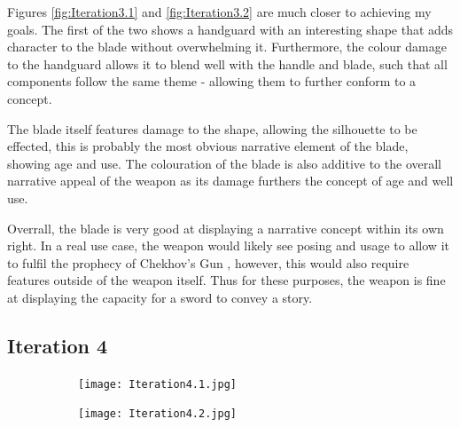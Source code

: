 \documentclass{article}
\begin{document}
Figures \ref{fig:Iteration3.1} and \ref{fig:Iteration3.2} are much closer to achieving my goals. The first of the two shows a handguard with an interesting shape that adds character to the blade without overwhelming it. Furthermore, the colour damage to the handguard allows it to blend well with the handle and blade, such that all components follow the same theme - allowing them to further conform to a concept.

The blade itself features damage to the shape, allowing the silhouette to be effected, this is probably the most obvious narrative element of the blade, showing age and use. The colouration of the blade is also additive to the overall narrative appeal of the weapon as its damage furthers the concept of age and well use.

Overrall, the blade is very good at displaying a narrative concept within its own right. In a real use case, the weapon would likely see posing and usage to allow it to fulfil the prophecy of Chekhov's Gun \parencite{delaney1990chekhov}, however, this would also require features outside of the weapon itself. Thus for these purposes, the weapon is fine at displaying the capacity for a sword to convey a story.

\pagebreak

\subsection{Iteration 4} \label{Iteration4}

\begin{figure}[h]
    \centering
    \caption{}
    \label{fig:Iteration4}
    \begin{subfigure}{0.49\textwidth}
        \texttt{[image: Iteration4.1.jpg]}
        \caption{}
        \label{fig:Iteration4.1}
    \end{subfigure}
    \begin{subfigure}{0.49\textwidth}
        \texttt{[image: Iteration4.2.jpg]}
        \caption{}
        \label{fig:Iteration4.2}
    \end{subfigure}
\end{figure}
\end{document}
